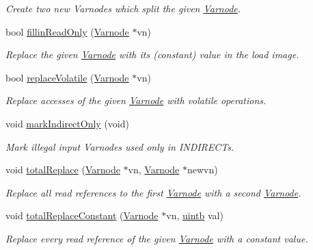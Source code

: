 \begin{DoxyCompactItemize}
\begin{DoxyCompactList}\small\item\em Create two new Varnodes which split the given \mbox{\hyperlink{class_varnode}{Varnode}}. \end{DoxyCompactList}\item 
bool \mbox{\hyperlink{class_funcdata_af47b9524aee42c71c7dbe260a4052485}{fillin\+Read\+Only}} (\mbox{\hyperlink{class_varnode}{Varnode}} $\ast$vn)
\begin{DoxyCompactList}\small\item\em Replace the given \mbox{\hyperlink{class_varnode}{Varnode}} with its (constant) value in the load image. \end{DoxyCompactList}\item 
bool \mbox{\hyperlink{class_funcdata_a754fe8bd5805e6d9fd8041365e7747eb}{replace\+Volatile}} (\mbox{\hyperlink{class_varnode}{Varnode}} $\ast$vn)
\begin{DoxyCompactList}\small\item\em Replace accesses of the given \mbox{\hyperlink{class_varnode}{Varnode}} with {\itshape volatile} operations. \end{DoxyCompactList}\item 
void \mbox{\hyperlink{class_funcdata_a41dc1e061256c4cc55e7afcf5995f435}{mark\+Indirect\+Only}} (void)
\begin{DoxyCompactList}\small\item\em Mark {\itshape illegal} {\itshape input} Varnodes used only in I\+N\+D\+I\+R\+E\+C\+Ts. \end{DoxyCompactList}\item 
void \mbox{\hyperlink{class_funcdata_aab7f940f85609d395283520eca3a71f0}{total\+Replace}} (\mbox{\hyperlink{class_varnode}{Varnode}} $\ast$vn, \mbox{\hyperlink{class_varnode}{Varnode}} $\ast$newvn)
\begin{DoxyCompactList}\small\item\em Replace all read references to the first \mbox{\hyperlink{class_varnode}{Varnode}} with a second \mbox{\hyperlink{class_varnode}{Varnode}}. \end{DoxyCompactList}\item 
void \mbox{\hyperlink{class_funcdata_a2934e1e4246d41a5e28f6fcb56acc937}{total\+Replace\+Constant}} (\mbox{\hyperlink{class_varnode}{Varnode}} $\ast$vn, \mbox{\hyperlink{types_8h_a2db313c5d32a12b01d26ac9b3bca178f}{uintb}} val)
\begin{DoxyCompactList}\small\item\em Replace every read reference of the given \mbox{\hyperlink{class_varnode}{Varnode}} with a constant value. \end{DoxyCompactList}\item 

\end{DoxyCompactItemize}
